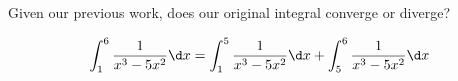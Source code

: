 \documentclass{ximera}
\begin{document}
\begin{exercise}
\begin{exercise}
\begin{exercise}
\begin{exercise}

Given our previous work, does our original integral converge or diverge?


\[
\int _{1}^{6} \frac{1}{x^3-5x^2} \d x=\int_{1}^{5} \frac{1}{x^3-5x^2} \d x + \int_{5}^{6} \frac{1}{x^3-5x^2} \d x
\]

\begin{multipleChoice}
\end{multipleChoice}


\end{exercise}


\end{exercise}
\end{exercise}
\end{exercise}
\end{document}
